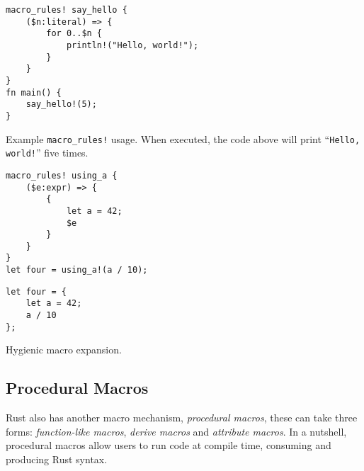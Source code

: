\begin{listing}
    \centering
    \begin{verbatim}
macro_rules! say_hello {
    ($n:literal) => {
        for 0..$n {
            println!("Hello, world!");
        }
    }
}
fn main() {
    say_hello!(5);
}
    \end{verbatim}
    \caption{Example \texttt{macro\_rules!} usage.
        When executed, the code above will print “\texttt{Hello, world!}” five times.}
    \label{lst:rust-macro-rules}
\end{listing}

\begin{listing}
    \centering
    \begin{minipage}[t]{0.45\textwidth}
        \begin{verbatim}
macro_rules! using_a {
    ($e:expr) => {
        {
            let a = 42;
            $e
        }
    }
}
let four = using_a!(a / 10);
    \end{verbatim}
        \label{lst:rust-macro-hygiene:a}
    \end{minipage}
    \hspace{2mm}
    \begin{minipage}[t]{0.45\textwidth}
            \begin{verbatim}
let four = {
    let a = 42;
    a / 10
};
        \end{verbatim}
        \label{lst:rust-macro-hygiene:b}
    \end{minipage}%
    \caption{Hygienic macro expansion.}
    \label{lst:rust-macro-hygiene}
\end{listing}


\subsection{Procedural Macros}

Rust also has another macro mechanism, \emph{procedural macros},
these can take three forms: \emph{function-like macros}, \emph{derive macros} and \emph{attribute macros}.
In a nutshell, procedural macros allow users to run code at compile time, consuming and producing Rust syntax.


